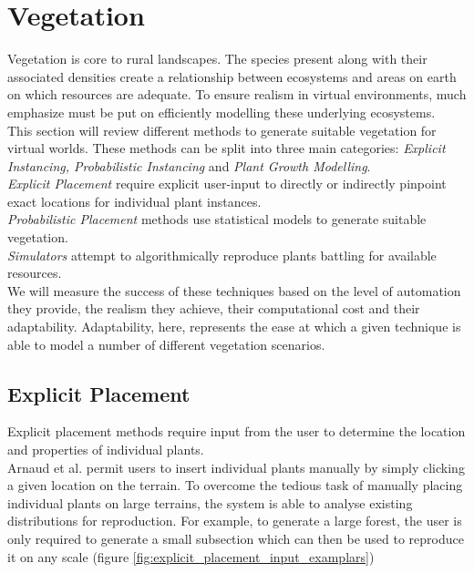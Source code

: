 \section{Vegetation}

Vegetation is core to rural landscapes. The species present along with their associated densities create a relationship between ecosystems and areas on earth on which resources are adequate. To ensure realism in virtual environments, much emphasize must be put on efficiently modelling these underlying ecosystems.\\

This section will review different methods to generate suitable vegetation for virtual worlds. These methods can be split into three main categories: \textit{Explicit Instancing, Probabilistic Instancing} and \textit{Plant Growth Modelling}.\\
\textit{Explicit Placement} require explicit user-input to directly or indirectly pinpoint exact locations for individual plant instances.\\
\textit{Probabilistic Placement} methods use statistical models to generate suitable vegetation.\\ 
\textit{Simulators} attempt to algorithmically reproduce plants battling for available resources.\\

We will measure the success of these techniques based on the level of automation they provide, the realism they achieve, their computational cost and their adaptability. Adaptability, here, represents the ease at which a given technique is able to model a number of different vegetation scenarios. \\

\subsection{Explicit Placement} \label{Explicit Placement}
Explicit placement methods require input from the user to determine the location and properties of individual plants. \\

Arnaud et al. \cite{Emilien} permit users to insert individual plants manually by simply clicking a given location on the terrain. To overcome the tedious task of manually placing individual plants on large terrains, the system is able to analyse existing distributions for reproduction. For example, to generate a large forest, the user is only required to generate a small subsection which can then be used to reproduce it on any scale (figure \ref{fig:explicit_placement_input_examplars}) \\


